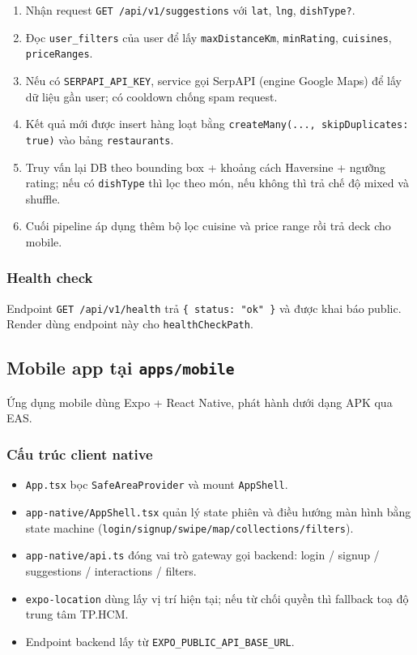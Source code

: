 \begin{enumerate}
  \item Nhận request \texttt{GET /api/v1/suggestions} với \texttt{lat}, \texttt{lng}, \texttt{dishType?}.
  \item Đọc \texttt{user\_filters} của user để lấy \texttt{maxDistanceKm}, \texttt{minRating}, \texttt{cuisines}, \texttt{priceRanges}.
  \item Nếu có \texttt{SERPAPI\_API\_KEY}, service gọi SerpAPI (engine Google Maps) để lấy dữ liệu gần user; có cooldown chống spam request.
  \item Kết quả mới được insert hàng loạt bằng \texttt{createMany(..., skipDuplicates: true)} vào bảng \texttt{restaurants}.
  \item Truy vấn lại DB theo bounding box + khoảng cách Haversine + ngưỡng rating; nếu có \texttt{dishType} thì lọc theo món, nếu không thì trả chế độ mixed và shuffle.
  \item Cuối pipeline áp dụng thêm bộ lọc cuisine và price range rồi trả deck cho mobile.
\end{enumerate}



\subsubsection{Health check}

Endpoint \texttt{GET /api/v1/health} trả \texttt{\{ status: "ok" \}} và được khai báo public. Render dùng endpoint này cho \texttt{healthCheckPath}.

\subsection{Mobile app tại \texttt{apps/mobile}}

Ứng dụng mobile dùng Expo + React Native, phát hành dưới dạng APK qua EAS.

\subsubsection{Cấu trúc client native}

\begin{itemize}
  \item \texttt{App.tsx} bọc \texttt{SafeAreaProvider} và mount \texttt{AppShell}.
  \item \texttt{app-native/AppShell.tsx} quản lý state phiên và điều hướng màn hình bằng state machine (\texttt{login/signup/swipe/map/collections/filters}).
  \item \texttt{app-native/api.ts} đóng vai trò gateway gọi backend: login / signup / suggestions / interactions / filters.
  \item \texttt{expo-location} dùng lấy vị trí hiện tại; nếu từ chối quyền thì fallback toạ độ trung tâm TP.HCM.
  \item Endpoint backend lấy từ \texttt{EXPO\_PUBLIC\_API\_BASE\_URL}.
\end{itemize}

